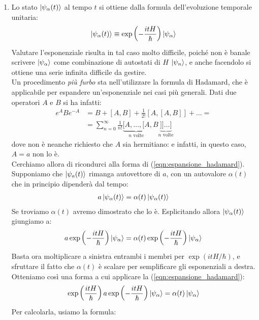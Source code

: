 \documentclass[../../FisicaTeorica.tex]{subfiles}
\begin{document}
\begin{enumerate}
\item Lo stato $\Ket{\psi_\alpha(t)}$ al tempo $t$ si ottiene dalla formula dell'evoluzione temporale unitaria:
\begin{align*}
\Ket{\psi_\alpha(t)} \equiv \exp\left(-\frac{itH}{\hbar}\right) \Ket{\psi_\alpha}
\end{align*}
Valutare l'esponenziale risulta in tal caso molto difficile, poiché non è banale scrivere $\Ket{\psi_\alpha}$ come combinazione di autostati di $H$ $\Ket{\psi_n}$, e anche facendolo si ottiene una serie infinita difficile da gestire.\\
Un procedimento \textit{più furbo} sta nell'utilizzare la formula di Hadamard, che è applicabile per espandere un'esponenziale nei casi più generali. Dati due operatori $A$ e $B$ si ha infatti:
\begin{align} \label{eqn:espansione_hadamard}
e^A B e^{-A} &= B + [A,B] + \frac{1}{2!}[A,[A,B]] + \dots =\\
&= \sum_{n=0}^\infty \frac{1}{n!} \underbrace{[A,\dots, [A}_{n \text{ volte}},B\underbrace{]]\dots]}_{n \text{ volte}} \nonumber
\end{align}
dove non è neanche richiesto che $A$ sia hermitiano: e infatti, in questo caso, $A=a$ non lo è.\\
Cerchiamo allora di ricondurci alla forma di (\ref{eqn:espansione_hadamard}). Supponiamo che $\Ket{\psi_a(t)}$ rimanga autovettore di $a$, con un autovalore $\alpha(t)$ che in principio dipenderà dal tempo:
\begin{align*}
a \Ket{\psi_\alpha(t)} = \alpha(t) \Ket{\psi_\alpha(t)}
\end{align*}
Se troviamo $\alpha(t)$ avremo dimostrato che lo è. Esplicitando allora $\Ket{\psi_\alpha(t)}$ giungiamo a:
\begin{align*}
a \exp \left(-\frac{itH}{\hbar}\right) \Ket{\psi_\alpha} = \alpha(t) \exp\left(-\frac{itH}{\hbar}\right)\Ket{\psi_\alpha}
\end{align*}
Basta ora moltiplicare a sinistra entrambi i membri per $\exp(itH/\hbar)$, e sfruttare il fatto che $\alpha(t)$ è scalare per semplificare gli esponenziali a destra. Otteniamo così una forma a cui applicare la (\ref{eqn:espansione_hadamard}):
\begin{align*}
\exp\left(\frac{itH}{\hbar}\right) a \exp\left(-\frac{itH}{\hbar}\right)\Ket{\psi_\alpha} = \alpha(t) \Ket{\psi_\alpha}
\end{align*}
Per calcolarla, usiamo la formula:


\end{enumerate}
\end{document}
